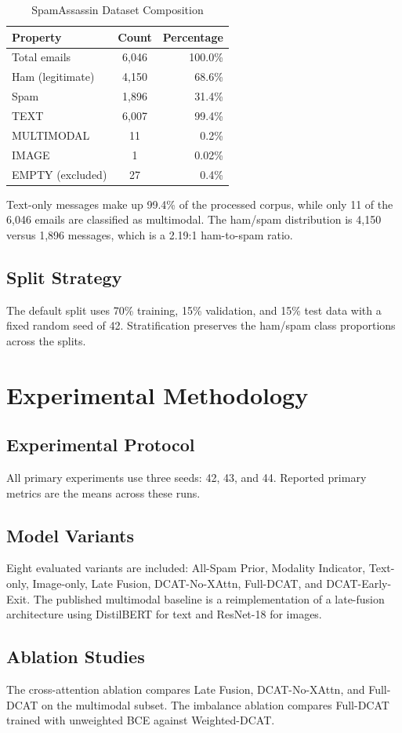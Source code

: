 \documentclass[conference]{IEEEtran}
\begin{document}
\begin{table}[htbp]
\centering
\renewcommand{\arraystretch}{1.2}
\caption{SpamAssassin Dataset Composition}
\label{tab:1}
\begin{tabular}{lcr}
\toprule
Property & Count & Percentage \\
\midrule
Total emails & 6,046 & 100.0\% \\
Ham (legitimate) & 4,150 & 68.6\% \\
Spam & 1,896 & 31.4\% \\
TEXT & 6,007 & 99.4\% \\
MULTIMODAL & 11 & 0.2\% \\
IMAGE & 1 & 0.02\% \\
EMPTY (excluded) & 27 & 0.4\% \\
\bottomrule
\end{tabular}
\end{table}

Text-only messages make up 99.4\% of the processed corpus, while only 11 of the 6,046 emails are classified as multimodal. The ham/spam distribution is 4,150 versus 1,896 messages, which is a 2.19:1 ham-to-spam ratio.
\subsection{Split Strategy}
The default split uses 70\% training, 15\% validation, and 15\% test data with a fixed random seed of 42. Stratification preserves the ham/spam class proportions across the splits.

\section{Experimental Methodology}
\subsection{Experimental Protocol}
All primary experiments use three seeds: 42, 43, and 44. Reported primary metrics are the means across these runs.
\subsection{Model Variants}
Eight evaluated variants are included:
All-Spam Prior, Modality Indicator, Text-only, Image-only, Late Fusion, DCAT-No-XAttn, Full-DCAT, and DCAT-Early-Exit.
The published multimodal baseline is a reimplementation of a late-fusion architecture using DistilBERT for text and ResNet-18 for images.
\subsection{Ablation Studies}
The cross-attention ablation compares Late Fusion, DCAT-No-XAttn, and Full-DCAT on the multimodal subset.
The imbalance ablation compares Full-DCAT trained with unweighted BCE against Weighted-DCAT.
\end{document}
